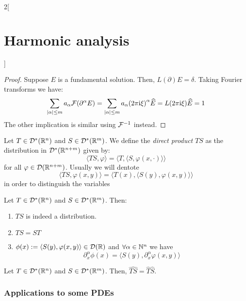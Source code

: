 \documentclass[../../../main_math.tex]{subfiles}
\begin{document}
\begin{multicols}{2}[\section{Harmonic analysis}]
\begin{theorem}
  \end{theorem}
  \begin{proof}
    Suppose $E$ is a fundamental solution. Then, $L(\partial)E=\delta$. Taking Fourier transforms we have:
    $$
      \sum_{\abs{\alpha}\leq m}a_\alpha\mathcal{F}{(\partial^\alpha E)}=\sum_{\abs{\alpha}\leq m}a_\alpha{(2\pi\mathrm{i}\xi)}^\alpha\widehat{E}=L(2\pi\mathrm{i}\xi)\widehat{E}=1
    $$
    The other implication is similar using $\mathcal{F}^{-1}$ instead.
  \end{proof}
  \begin{definition}
    Let $T\in \mathcal{D}^*(\mathbb{R}^n)$ and $S\in \mathcal{D}^*(\mathbb{R}^m)$. We define the \emph{direct product} $TS$ as the distribution in $\mathcal{D}^*(\mathbb{R}^{n+m})$ given by:
    $$
      \langle TS,\varphi\rangle=\langle T,\langle S ,\varphi(x,\cdot)\rangle\rangle
    $$
    for all $\varphi\in \mathcal{D}(\mathbb{R}^{n+m})$. Usually we will dentote
    $$\langle TS,\varphi(x,y)\rangle=\langle T(x),\langle S(y) ,\varphi(x,y)\rangle\rangle$$
    in order to distinguish the variables
  \end{definition}
  \begin{lemma}
    Let $T\in \mathcal{D}^*(\mathbb{R}^n)$ and $S\in \mathcal{D}^*(\mathbb{R}^m)$. Then:
    \begin{enumerate}
      \item $TS$ is indeed a distribution.
      \item $TS=ST$
      \item $\phi(x):=\langle S(y), \varphi(x,y)\rangle\in \mathcal{D}(\mathbb{R})$ and $\forall \alpha\in\mathbb{N}^n$ we have $$\partial_x^\alpha\phi(x)=\langle S(y), \partial_x^\alpha\varphi(x,y)\rangle$$
    \end{enumerate}
  \end{lemma}
  \begin{proposition}
    Let $T\in \mathcal{D}^*(\mathbb{R}^n)$ and $S\in \mathcal{D}^*(\mathbb{R}^m)$. Then, $\widehat{TS}=\widehat{T}\widehat{S}$.
  \end{proposition}
  \subsubsection{Applications to some PDEs}

\end{multicols}
\end{document}
